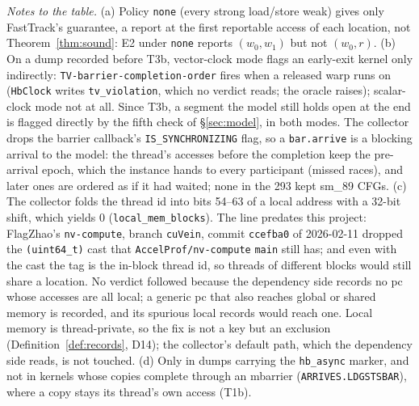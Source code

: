 \documentclass[11pt]{article}
\theoremstyle{remark}
\begin{document}
\noindent\emph{Notes to the table.} (a) Policy \texttt{none} (every strong load/store weak)
gives only FastTrack's guarantee, a report at the first reportable access of each location,
not Theorem~\ref{thm:sound}: E2 under \texttt{none} reports $(w_0,w_1)$ but not $(w_0,r)$.
(b) On a dump recorded before T3b, vector-clock mode flags an early-exit kernel only
indirectly: \texttt{TV-barrier-completion-order} fires when a released warp runs on (\texttt{HbClock}
writes \texttt{tv\_violation}, which no verdict reads; the oracle raises);
scalar-clock mode not at all. Since T3b, a segment the model still holds open at the end is
flagged directly by the fifth check of \S\ref{sec:model}, in both modes. The collector drops the barrier callback's
\texttt{IS\_SYNCHRONIZING} flag, so a \texttt{bar.arrive} is a blocking arrival to the model:
the thread's accesses before the completion keep the pre-arrival epoch, which the instance
hands to every participant (missed races), and later ones are ordered as if it had waited;
none in the 293 kept sm\_89 CFGs. (c) The collector folds the thread id into bits 54--63 of a
local address with a 32-bit shift, which yields 0 (\texttt{local\_mem\_blocks}). The line
predates this project: FlagZhao's \texttt{nv-compute}, branch \texttt{cuVein}, commit
\texttt{ccefba0} of 2026-02-11 dropped the \texttt{(uint64\_t)} cast that
\texttt{AccelProf/nv-compute} \texttt{main} still has; and even with the cast the tag is
the in-block thread id, so threads of different blocks would still share a location. No
verdict followed because the dependency side records no pc whose accesses are all local; a
generic pc that also reaches global or shared memory is recorded, and its spurious local
records would reach one. Local memory is thread-private, so the fix is not a key but an
exclusion (Definition~\ref{def:records}, D14); the collector's default path, which the
dependency side reads, is not touched. (d) Only in dumps carrying the \texttt{hb\_async} marker, and not in
kernels whose copies complete through an mbarrier (\texttt{ARRIVES.LDGSTSBAR}), where a copy
stays its thread's own access (T1b).
\end{document}
